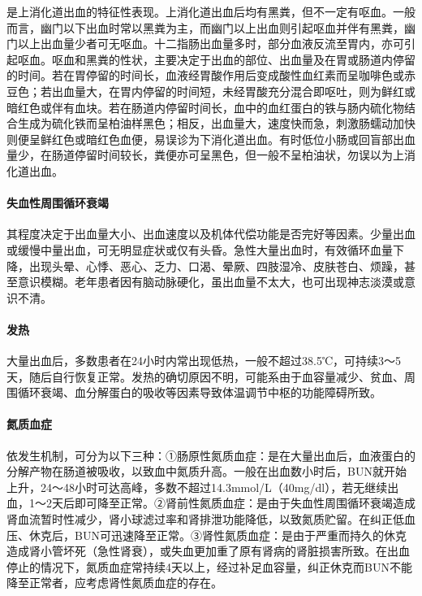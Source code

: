 是上消化道出血的特征性表现。上消化道出血后均有黑粪，但不一定有呕血。一般而言，幽门以下出血时常以黑粪为主，而幽门以上出血则引起呕血并伴有黑粪，幽门以上出血量少者可无呕血。十二指肠出血量多时，部分血液反流至胃内，亦可引起呕血。呕血和黑粪的性状，主要决定于出血的部位、出血量及在胃或肠道内停留的时间。若在胃停留的时间长，血液经胃酸作用后变成酸性血红素而呈咖啡色或赤豆色；若出血量大，在胃内停留的时间短，未经胃酸充分混合即呕吐，则为鲜红或暗红色或伴有血块。若在肠道内停留时间长，血中的血红蛋白的铁与肠内硫化物结合生成为硫化铁而呈柏油样黑色；相反，出血量大，速度快而急，刺激肠蠕动加快则便呈鲜红色或暗红色血便，易误诊为下消化道出血。有时低位小肠或回盲部出血量少，在肠道停留时间较长，粪便亦可呈黑色，但一般不呈柏油状，勿误以为上消化道出血。

\paragraph{失血性周围循环衰竭}

其程度决定于出血量大小、出血速度以及机体代偿功能是否完好等因素。少量出血或缓慢中量出血，可无明显症状或仅有头昏。急性大量出血时，有效循环血量下降，出现头晕、心悸、恶心、乏力、口渴、晕厥、四肢湿冷、皮肤苍白、烦躁，甚至意识模糊。老年患者因有脑动脉硬化，虽出血量不太大，也可出现神志淡漠或意识不清。

\paragraph{发热}

大量出血后，多数患者在24小时内常出现低热，一般不超过38.5℃，可持续3～5天，随后自行恢复正常。发热的确切原因不明，可能系由于血容量减少、贫血、周围循环衰竭、血分解蛋白的吸收等因素导致体温调节中枢的功能障碍所致。

\paragraph{氮质血症}

依发生机制，可分为以下三种：①肠原性氮质血症：是在大量出血后，血液蛋白的分解产物在肠道被吸收，以致血中氮质升高。一般在出血数小时后，BUN就开始上升，24～48小时可达高峰，多数不超过14.3mmol/L（40mg/dl），若无继续出血，1～2天后即可降至正常。②肾前性氮质血症：是由于失血性周围循环衰竭造成肾血流暂时性减少，肾小球滤过率和肾排泄功能降低，以致氮质贮留。在纠正低血压、休克后，BUN可迅速降至正常。③肾性氮质血症：是由于严重而持久的休克造成肾小管坏死（急性肾衰），或失血更加重了原有肾病的肾脏损害所致。在出血停止的情况下，氮质血症常持续4天以上，经过补足血容量，纠正休克而BUN不能降至正常者，应考虑肾性氮质血症的存在。

